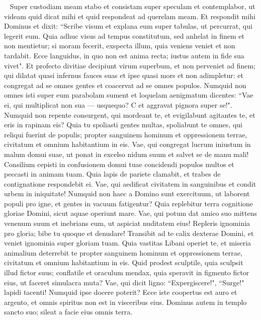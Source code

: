 \begin{biblechapter}   
\verse Super custodiam meam stabo et consistam super speculam et contemplabor, ut videam quid dicat mihi et quid respondeat ad querelam meam. 
\verse Et respondit mihi Dominus et dixit: “Scribe visum et explana eum super tabulas, ut percurrat, qui legerit eum. 
\verse Quia adhuc visus ad tempus constitutum, sed anhelat in finem et non mentietur; si moram fecerit, exspecta illum, quia veniens veniet et non tardabit. 
\verse Ecce languidus, in quo non est anima recta; iustus autem in fide sua vivet". 
\verse Et profecto divitiae decipiunt virum superbum, et non perveniet ad finem; qui dilatat quasi infernus fauces suas et ipse quasi mors et non adimpletur: et congregat ad se omnes gentes et coacervat ad se omnes populos. 
\verse Numquid non omnes isti super eum parabolam sument et loquelam aenigmatum dicentes: “Vae ei, qui multiplicat non sua — usquequo? C et aggravat pignora super se!". 
\verse Numquid non repente consurgent, qui mordeant te, et evigilabunt agitantes te, et eris in rapinam eis? 
\verse Quia tu spoliasti gentes multas, spoliabunt te omnes, qui reliqui fuerint de populis; propter sanguinem hominum et oppressionem terrae, civitatum et omnium habitantium in eis. 
\verse Vae, qui congregat lucrum iniustum in malum domui suae, ut ponat in excelso nidum suum et salvet se de manu mali! 
\verse Consilium cepisti in confusionem domui tuae concidendi populos multos et peccasti in animam tuam. 
\verse Quia lapis de pariete clamabit, et trabes de contignatione respondebit ei. 
\verse Vae, qui aedificat civitatem in sanguinibus et condit urbem in iniquitate! 
\verse Numquid non haec a Domino sunt exercituum, ut laborent populi pro igne, et gentes in vacuum fatigentur? 
\verse Quia replebitur terra cognitione gloriae Domini, sicut aquae operiunt mare. 
\verse Vae, qui potum dat amico suo mittens venenum suum et inebrians eum, ut aspiciat nuditatem eius! 
\verse Repleris ignominia pro gloria; bibe tu quoque et denudare! Transibit ad te calix dexterae Domini, et veniet ignominia super gloriam tuam. 
\verse Quia vastitas Libani operiet te, et miseria animalium deterrebit te propter sanguinem hominum et oppressionem terrae, civitatum et omnium habitantium in eis. 
\verse Quid prodest sculptile, quia sculpsit illud fictor suus; conflatile et oraculum mendax, quia speravit in figmento fictor eius, ut faceret simulacra muta? 
\verse Vae, qui dicit ligno: “Expergiscere!", “Surge!" lapidi tacenti! Numquid ipse docere poterit? Ecce iste coopertus est auro et argento, et omnis spiritus non est in visceribus eius. 
\verse Dominus autem in templo sancto suo; sileat a facie eius omnis terra. 
\end{biblechapter}

